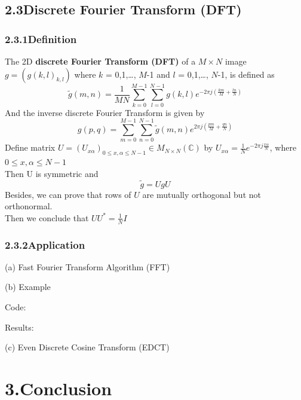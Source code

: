\documentclass[12pt]{article}
\begin{document}
\subsection*{2.3\quad Discrete Fourier Transform (DFT)}

\subsubsection*{2.3.1\quad Definition}
The 2D \textbf{discrete Fourier Transform (DFT)} of a $M\times N$ image $g = (g(k,l)_{k,l})$ 
where $k$ = 0,1,\ldots, $M$-1 and $l$ = 0,1,\ldots, $N$-1, is defined as 
\begin{equation*}
    \tilde{g}(m,n) = \frac{1}{MN}\sum_{k=0}^{M-1}\sum_{l=0}^{N-1}g(k,l)e^{-2\pi j(\frac{km}{M}+\frac{ln}{N})}
\end{equation*}
And the inverse discrete Fourier Transform is given by
\begin{equation*}
    g(p,q) = \sum_{m=0}^{M-1}\sum_{n=0}^{N-1}\tilde{g}(m,n)e^{2\pi j(\frac{pm}{M}+\frac{qn}{N})}
\end{equation*}
Define matrix $U=(U_{x\alpha})_{0\leqslant x,\alpha \leqslant N-1}\in M_{N\times N}(\mathbb{C})$
by $U_{x\alpha}=\frac{1}{N} e^{-2\pi j\frac{x\alpha}{N}}$, where $0\leqslant x,\alpha \leqslant N-1$\\
Then U is symmetric and 
\begin{equation*}
    \tilde{g} = UgU
\end{equation*}
Besides, we can prove that rows of $U$ are mutually orthogonal but not orthonormal.\\
Then we conclude that $UU^{\ast}=\frac{1}{N}I$

\subsubsection*{2.3.2\quad Application}
(a) Fast Fourier Transform Algorithm (FFT)

\begin{flushleft}
(b) Example

Code: 
\end{flushleft}

\begin{flushleft}
Results:
\end{flushleft}

\begin{flushleft}
(c) Even Discrete Cosine Transform (EDCT)
\end{flushleft}



\section*{3.\quad Conclusion}
\end{document}
